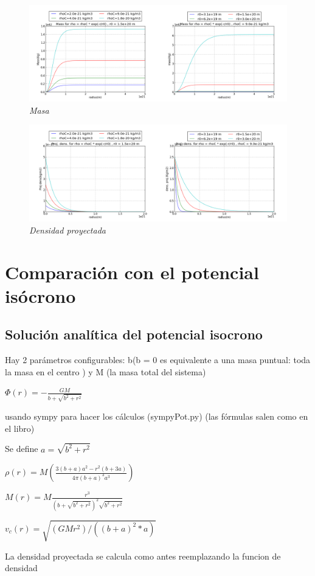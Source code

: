 \documentclass[12pt]{book}
\begin{document}
\begin{figure}[!ht]
 \centering
 \includegraphics[scale=0.33]{massFinal.png}
 \caption{\emph{Masa}}
\end{figure}


\begin{figure}[!ht]
 \centering
 \includegraphics[scale=0.33]{dpFinal.png}
 \caption{\emph{Densidad proyectada}}
\end{figure}

\clearpage

\section*{Comparación con el potencial isócrono}


\subsection*{Solución analítica del potencial isocrono}

\begin{description}
\item Hay 2 parámetros configurables: b(b = 0 es equivalente a una masa puntual: toda la masa en el centro )  y M (la masa total del sistema) 
 
\item $ \Phi(r) =  -\frac{G  M}  {b + \sqrt{b^2 + r^2}}  $
\item usando sympy para hacer los cálculos (sympyPot.py) (las fórmulas salen como en el libro)
\item  Se define  $a = \sqrt{b^2 + r^2}$
\item $ \rho(r) =  M  ( \frac{3(b+a)a^2 - r^2(b+3a) }{4 \pi (b+a)^3  a^3 })$		
\item $ M(r) = M\frac{r^3}{(b + \sqrt{b^2 + r^2})^2 \sqrt{b^2 + r^2}} $ 
\item $ v_c(r) =  \sqrt{(G  M  r ^ 2)/((b + a)^2 * a)} $ 
\item La densidad proyectada se calcula como antes reemplazando la funcion de densidad
\end{description}
\end{document}
